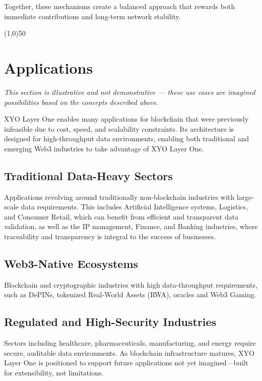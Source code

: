 \documentclass{article}
\begin{document}
Together, these mechanisms create a balanced approach that rewards both
immediate contributions and long-term network stability.

\begin{center}
    \line(1,0){50}
\end{center}

\section{Applications}
\textit{This section is illustrative and not demonstrative — these use cases are imagined possibilities based on the concepts described above.}

XYO Layer One enables many applications for blockchain that were previously
infeasible due to cost, speed, and scalability constraints. Its architecture is
designed for high-throughput data environments, enabling both traditional and
emerging Web3 industries to take advantage of XYO Layer One.

\subsection{Traditional Data-Heavy Sectors}
Applications revolving around traditionally non-blockchain industries with
large-scale data requirements. This includes Artificial Intelligence systems,
Logistics, and Consumer Retail, which can benefit from efficient and
transparent data validation, as well as the IP management, Finance, and Banking
industries, where traceability and transparency is integral to the success of
businesses.

\subsection{Web3-Native Ecosystems}
Blockchain and cryptographic industries with high data-throughput requirements,
such as DePINs, tokenized Real-World Assets (RWA), oracles and Web3 Gaming.

\subsection{Regulated and High-Security Industries}
Sectors including healthcare, pharmaceuticals, manufacturing, and energy
require secure, auditable data environments. As blockchain infrastructure
matures, XYO Layer One is positioned to support future applications not yet
imagined—built for extensibility, not limitations.
\end{document}
